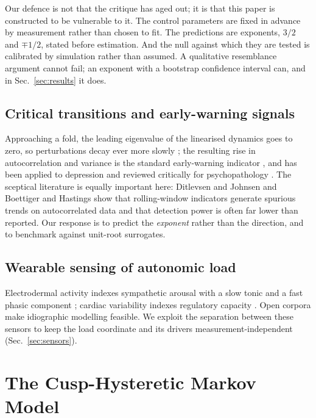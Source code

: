 \documentclass[conference]{IEEEtran}
\begin{document}
Our defence is not that the critique has aged out; it is that this paper is
constructed to be vulnerable to it. The control parameters are fixed in advance
by measurement rather than chosen to fit. The predictions are exponents,
$3/2$ and $\mp1/2$, stated before estimation. And the null against which they
are tested is calibrated by simulation rather than assumed. A qualitative
resemblance argument cannot fail; an exponent with a bootstrap confidence
interval can, and in Sec.~\ref{sec:results} it does.

\subsection{Critical transitions and early-warning signals}
Approaching a fold, the leading eigenvalue of the linearised dynamics goes to
zero, so perturbations decay ever more slowly \cite{wissel1984}; the resulting
rise in autocorrelation and variance is the standard early-warning indicator
\cite{scheffer2009,scheffer2012,dakos2012}, and has been applied to depression
\cite{leemput2014,wichers2020,smit2025} and reviewed critically for
psychopathology \cite{helmich2021}. The sceptical literature is equally
important here: Ditlevsen and Johnsen \cite{ditlevsen2010} and Boettiger and
Hastings \cite{boettiger2012} show that rolling-window indicators generate
spurious trends on autocorrelated data and that detection power is often far
lower than reported. Our response is to predict the \emph{exponent} rather than
the direction, and to benchmark against unit-root surrogates.

\subsection{Wearable sensing of autonomic load}
Electrodermal activity indexes sympathetic arousal with a slow tonic and a fast
phasic component \cite{boucsein2012,benedek2010,greco2016cvxeda,
posadaquintero2020}; cardiac variability indexes regulatory capacity
\cite{shaffer2017}. Open corpora \cite{schmidt2018wesad,amin2022exam,
hosseini2022nurse} make idiographic modelling feasible. We exploit the
separation between these sensors to keep the load coordinate and its drivers
measurement-independent (Sec.~\ref{sec:sensors}).

\section{The Cusp-Hysteretic Markov Model}
\label{sec:model}
\end{document}
